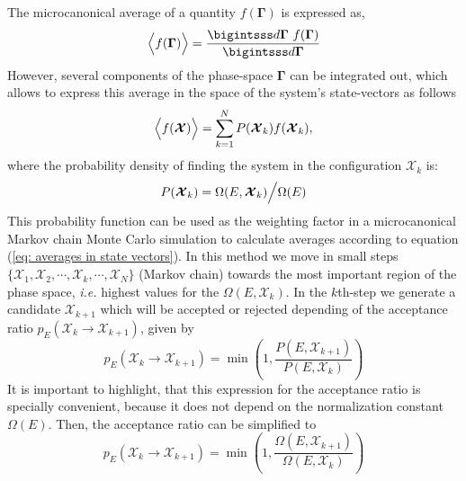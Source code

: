 \documentclass[a4paper,12pt]{article}
\begin{document}
The microcanonical average of a quantity $f(\boldsymbol{\Gamma})$ is expressed as,
\begin{equation}
\Bigl\langle f(\boldsymbol{\Gamma}) \Bigr\rangle
=
\frac{
\bigintsss d\boldsymbol{\Gamma}\,\,f(\boldsymbol{\Gamma})
}{
\bigintsss d\boldsymbol{\Gamma}
}
\end{equation}
However, several components of the phase-space $\boldsymbol{\Gamma}$
can be integrated out, which allows to express this average in the space of the system's state-vectors
as follows
\begin{equation}
\Bigl\langle f(\boldsymbol{\mathcal{X}}) \Bigr\rangle = \sum_{k=1}^{N}
P(\boldsymbol{\mathcal{X}}_k) f(\boldsymbol{\mathcal{X}}_k),
\label{eq: averages in state vectors}
\end{equation}
where the probability density of finding the system in the configuration $\boldsymbol{\mathcal{X}}_k$ is:
\begin{equation}
P(\boldsymbol{\mathcal{X}}_k)
=
\Omega(E,\boldsymbol{\mathcal{X}}_k)\Bigl/\Omega(E)
\end{equation}
This probability function can be used as the weighting factor in a microcanonical Markov chain Monte Carlo
simulation to calculate averages according to equation (\ref{eq: averages in state vectors}).
In this method we move in small steps
$\{\boldsymbol{\mathcal{X}}_1, \boldsymbol{\mathcal{X}}_2, \cdots, \boldsymbol{\mathcal{X}}_k, \cdots, \boldsymbol{\mathcal{X}}_N\}$
(Markov chain) towards the most important region of the phase space,
\textit{i.e.} highest values for the $\Omega(E,\boldsymbol{\mathcal{X}}_k)$.
In the $k$th-step we generate a candidate $\boldsymbol{\mathcal{X}}_{k+1}$ which will be accepted or rejected depending
of the acceptance ratio $p_E(\boldsymbol{\mathcal{X}}_k\rightarrow\boldsymbol{\mathcal{X}}_{k+1})$, given by
\begin{equation}
p_E(\boldsymbol{\mathcal{X}}_k\rightarrow\boldsymbol{\mathcal{X}}_{k+1})
=
\min\left(
1,
\frac{P(E,\boldsymbol{\mathcal{X}}_{k+1})}{P(E,\boldsymbol{\mathcal{X}}_k)}
\right)
\label{eq: acceptance probability}
\end{equation}
It is important to highlight, that this expression for the acceptance ratio is specially convenient, because
it does not depend on the normalization constant $\Omega(E)$. Then, the acceptance ratio can be simplified to
\begin{equation}
p_E(\boldsymbol{\mathcal{X}}_k\rightarrow\boldsymbol{\mathcal{X}}_{k+1})
=
\min\left(
1,
\frac{\Omega(E,\boldsymbol{\mathcal{X}}_{k+1})}{\Omega(E,\boldsymbol{\mathcal{X}}_k)}
\right)
\end{equation}
\end{document}
